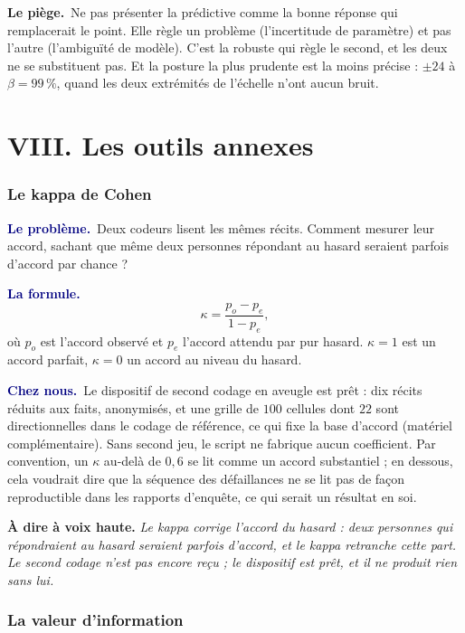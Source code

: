 \documentclass[11pt,a4paper]{article}
\newcommand{\lequoi}[1]{\smallskip\noindent\textcolor{navy}{\textbf{Le problème.}}\ #1\par}
\newcommand{\laformule}[1]{\smallskip\noindent\textcolor{navy}{\textbf{La formule.}}\ #1\par}
\newcommand{\cheznous}[1]{\smallskip\noindent\textcolor{navy}{\textbf{Chez nous.}}\ #1\par}
\newcommand{\lepiege}[1]{\smallskip\noindent\textcolor{accent}{\textbf{Le piège.}}\ #1\par}
\newcommand{\laphrase}[1]{\begin{phrasebox}\textbf{À dire à voix haute.} \emph{#1}\end{phrasebox}}
\begin{document}
\lepiege{Ne pas présenter la prédictive comme \og la bonne réponse\fg{} qui remplacerait le
point. Elle règle un problème (l'incertitude de paramètre) et pas l'autre (l'ambiguïté de modèle).
C'est la robuste qui règle le second, et les deux ne se substituent pas. Et la posture la plus
prudente est la moins précise : $\pm24$ à $\beta=99\,\%$, quand les deux extrémités de l'échelle
n'ont aucun bruit.}

\part*{VIII. Les outils annexes}

\section{Le kappa de Cohen}

\lequoi{Deux codeurs lisent les mêmes récits. Comment mesurer leur accord, sachant que même
deux personnes répondant au hasard seraient parfois d'accord par chance ?}

\laformule{
\[
  \kappa = \frac{p_o - p_e}{1 - p_e},
\]
où $p_o$ est l'accord observé et $p_e$ l'accord attendu par pur hasard. $\kappa=1$ est un
accord parfait, $\kappa=0$ un accord au niveau du hasard.}

\cheznous{Le dispositif de second codage en aveugle est prêt : dix récits réduits aux faits,
anonymisés, et une grille de $100$ cellules dont $22$ sont directionnelles dans le codage de
référence, ce qui fixe la base d'accord (matériel complémentaire). Sans second jeu, le script ne
fabrique aucun coefficient. Par convention, un $\kappa$ au-delà de $0{,}6$ se lit comme un accord
substantiel ; en dessous, cela voudrait dire que la séquence des défaillances ne se lit pas de
façon reproductible dans les rapports d'enquête, ce qui serait un résultat en soi.}

\laphrase{Le kappa corrige l'accord du hasard : deux personnes qui répondraient au hasard seraient
parfois d'accord, et le kappa retranche cette part. Le second codage n'est pas encore reçu ; le
dispositif est prêt, et il ne produit rien sans lui.}

\section{La valeur d'information}
\end{document}
